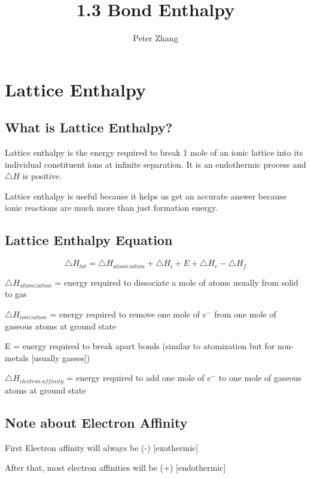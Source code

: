 \documentclass[12pt]{article} %
\title{1.3 Bond Enthalpy}
\author{Peter Zhang}
\begin{document}
\maketitle

\pagebreak

\tableofcontents

\pagebreak

\section{Lattice Enthalpy}
\subsection{What is Lattice Enthalpy?}
Lattice enthalpy is the energy required to break 1 mole of an ionic lattice into its individual constituent ions at infinite separation. It is an endothermic process and $\triangle{H}$ is positive.

Lattice enthalpy is useful because it helps us get an accurate answer because ionic reactions are much more than just formation energy. 

\subsection{Lattice Enthalpy Equation}
$$\triangle{H}_{lat} = \triangle{H}_{atomization} + \triangle{H}_i + E + \triangle{H}_e - \triangle{H}_f$$

$\triangle{H}_{atomization}$ = energy required to dissociate a mole of atoms usually from solid to gas

$\triangle{H}_{ionization}$ = energy required to remove one mole of $e^-$ from one mole of gaseous atoms at ground state

E = energy required to break apart bonds (similar to atomization but for non-metals [usually gasses])

$\triangle{H}_{electron\ affinity}$ = energy required to add one mole of $e^-$ to one mole of gaseous atoms at ground state

\subsection{Note about Electron Affinity}

First Electron affinity will always be (-) [exothermic]

After that, most electron affinities will be (+) [endothermic]

\pagebreak
\end{document}
